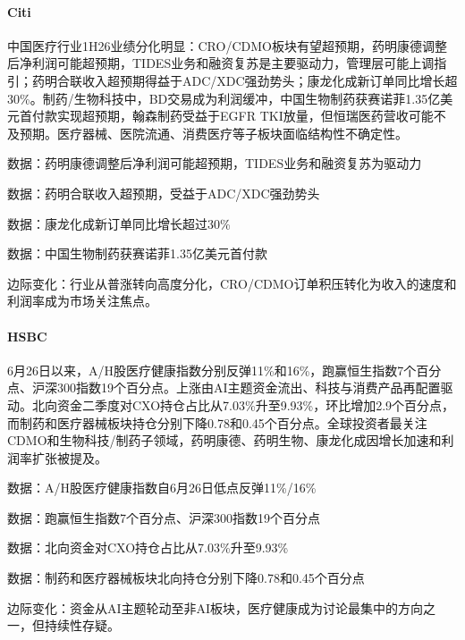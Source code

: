 \documentclass[11pt]{ctexart}
\begin{document}
\paragraph{Citi} 中国医疗行业1H26业绩分化明显：CRO/CDMO板块有望超预期，药明康德调整后净利润可能超预期，TIDES业务和融资复苏是主要驱动力，管理层可能上调指引；药明合联收入超预期得益于ADC/XDC强劲势头；康龙化成新订单同比增长超30\%。制药/生物科技中，BD交易成为利润缓冲，中国生物制药获赛诺菲1.35亿美元首付款实现超预期，翰森制药受益于EGFR TKI放量，但恒瑞医药营收可能不及预期。医疗器械、医院流通、消费医疗等子板块面临结构性不确定性。
{\small\color{refgray}数据：药明康德调整后净利润可能超预期，TIDES业务和融资复苏为驱动力\par}
{\small\color{refgray}数据：药明合联收入超预期，受益于ADC/XDC强劲势头\par}
{\small\color{refgray}数据：康龙化成新订单同比增长超过30\%\par}
{\small\color{refgray}数据：中国生物制药获赛诺菲1.35亿美元首付款\par}
{\small\color{refgray}边际变化：行业从普涨转向高度分化，CRO/CDMO订单积压转化为收入的速度和利润率成为市场关注焦点。\par}
\paragraph{HSBC} 6月26日以来，A/H股医疗健康指数分别反弹11\%和16\%，跑赢恒生指数7个百分点、沪深300指数19个百分点。上涨由AI主题资金流出、科技与消费产品再配置驱动。北向资金二季度对CXO持仓占比从7.03\%升至9.93\%，环比增加2.9个百分点，而制药和医疗器械板块持仓分别下降0.78和0.45个百分点。全球投资者最关注CDMO和生物科技/制药子领域，药明康德、药明生物、康龙化成因增长加速和利润率扩张被提及。
{\small\color{refgray}数据：A/H股医疗健康指数自6月26日低点反弹11\%/16\%\par}
{\small\color{refgray}数据：跑赢恒生指数7个百分点、沪深300指数19个百分点\par}
{\small\color{refgray}数据：北向资金对CXO持仓占比从7.03\%升至9.93\%\par}
{\small\color{refgray}数据：制药和医疗器械板块北向持仓分别下降0.78和0.45个百分点\par}
{\small\color{refgray}边际变化：资金从AI主题轮动至非AI板块，医疗健康成为讨论最集中的方向之一，但持续性存疑。\par}
\end{document}
